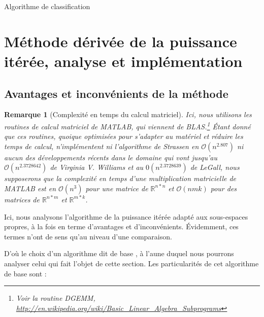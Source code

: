 \documentclass[a4paper,12pt]{article}
\newtheorem*{remark}{Remarque}
\begin{document}
        \begin{algorithm}
            \DontPrintSemicolon
            \caption{Algorithme de classification}
        \end{algorithm}

\section{Méthode dérivée de la puissance itérée, analyse et implémentation}

    \subsection{Avantages et inconvénients de la méthode}

        \begin{remark}[Complexité en temps du calcul matriciel]
        Ici, nous utilisons les routines de calcul matriciel de MATLAB, qui
        viennent de BLAS.\footnote{Voir la routine DGEMM,
        \url{http://en.wikipedia.org/wiki/Basic_Linear_Algebra_Subprograms}}
        Étant donné que ces routines, quoique optimisées pour s'adapter au
        matériel et réduire les temps de calcul, n'implémentent ni l'algorithme
        de Strassen en $\mathcal{O}(n^{2.807})$ ni aucun des développements
        récents dans le domaine qui vont jusqu'au $\mathcal{O}(n^{2.3728642})$ de
        Virginia V. Williams et au $\mathcal{0}(n^{2.3728639})$ de LeGall, nous supposerons que la complexité en temps d'une
        multiplication matricielle de MATLAB est en $\mathcal{O}(n^3)$ pour une
        matrice de $\mathbb{R}^{n*n}$ et $\mathcal{O}(nmk)$ pour des matrices de
        $\mathbb{R}^{n*m}$ et $\mathbb{R}^{m*k}$.
        \end{remark}

        Ici, nous analysons l'algorithme de la puissance itérée adapté aux
        sous-espaces propres, à la fois en terme d'avantages et d'inconvénients.
        Évidemment, ces termes n'ont de sens qu'au niveau d'une comparaison.

        D'où le choix d'un algorithme dit \og de base \fg, à l'aune duquel nous
        pourrons analyser celui qui fait l'objet de cette section.  Les
        particularités de cet algorithme \og de base \fg sont :
\end{document}
